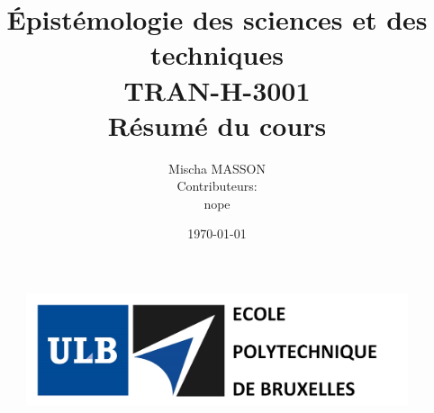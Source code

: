 \documentclass{report}
\title{\Huge \textbf{\'{E}pistémologie des sciences et des techniques}\\
	\Large TRAN-H-3001\\
	Résumé du cours}
\date{\today}
\author{Mischa MASSON\\
	Contributeurs:\\
	nope
	}
\begin{document}
	
	\begin{figure}[t]
		\includegraphics[width=15cm]{entete.PNG}
	\end{figure}
	
	\maketitle
	
	\renewcommand{\abstractname}{\og Synthèses, Open Source et contributions\fg, Mischa Masson\\ Université Libre de Bruxelles\\2015-2016.}
	
	\BgThispage
	
\end{document}
